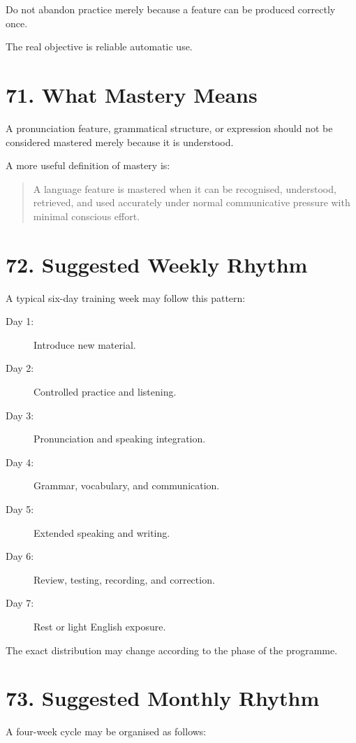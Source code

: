 Do not abandon practice merely because a feature can be produced correctly once.

The real objective is reliable automatic use.

\section*{71. What Mastery Means}

A pronunciation feature, grammatical structure, or expression should not be considered mastered merely because it is understood.

A more useful definition of mastery is:

\begin{quote}
A language feature is mastered when it can be recognised, understood, retrieved, and used accurately under normal communicative pressure with minimal conscious effort.
\end{quote}

\section*{72. Suggested Weekly Rhythm}

A typical six-day training week may follow this pattern:

\begin{description}
    \item[Day 1:] Introduce new material.
    \item[Day 2:] Controlled practice and listening.
    \item[Day 3:] Pronunciation and speaking integration.
    \item[Day 4:] Grammar, vocabulary, and communication.
    \item[Day 5:] Extended speaking and writing.
    \item[Day 6:] Review, testing, recording, and correction.
    \item[Day 7:] Rest or light English exposure.
\end{description}

The exact distribution may change according to the phase of the programme.

\section*{73. Suggested Monthly Rhythm}

A four-week cycle may be organised as follows:

